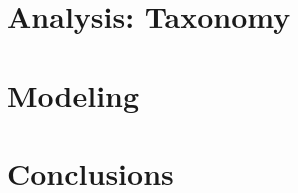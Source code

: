 \documentclass[11pt,a4paper]{article}
\begin{document}
\section{Analysis: Taxonomy}
\label{sec:taxo}
%

\section{Modeling}
\label{sec:modeling}


\section{Conclusions}
\label{sec:conc}




% 
\end{document}
